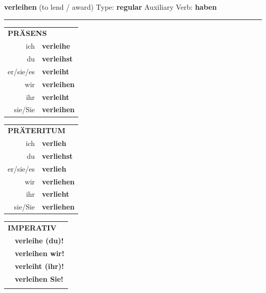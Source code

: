 \documentclass[10pt,a4paper]{revtex4-2}
\begin{document}
\begin{verbbox}
    {\Large \bf verleihen} (to lend / award) \hfill Type: \textbf{regular} \hfill Auxiliary Verb: \textbf{haben} 
    
     \vspace{5pt}

    \hrule
    
    \vspace{5pt}

  \begin{tabular}{rl}
     \multicolumn{2}{l}{\textbf{PRÄSENS} }\\
    ich & \textbf{verleihe}\\
    du & \textbf{verleihst}\\
    er/sie/es & \textbf{verleiht}\\
    wir & \textbf{verleihen}\\
    ihr & \textbf{verleiht}\\
    sie/Sie & \textbf{verleihen}\\
  \end{tabular}
  \hfill
  \begin{tabular}{rl}
    \multicolumn{2}{l}{\textbf{PRÄTERITUM} }\\
    ich & \textbf{verlieh}\\
    du & \textbf{verliehst}\\
    er/sie/es & \textbf{verlieh}\\
    wir & \textbf{verliehen}\\
    ihr & \textbf{verlieht}\\
    sie/Sie & \textbf{verliehen}\\
  \end{tabular}
  \hfill
  \begin{tabular}{rl}
     \multicolumn{2}{l}{\textbf{IMPERATIV} }\\
   & \textbf{verleihe (du)!}\\
   & \textbf{verleihen wir!}\\
   & \textbf{verleiht (ihr)!}\\
   & \textbf{verleihen Sie!}\\
   & \vspace{10pt}
  \end{tabular}

 \vspace{10pt}


\end{verbbox}
\end{document}
